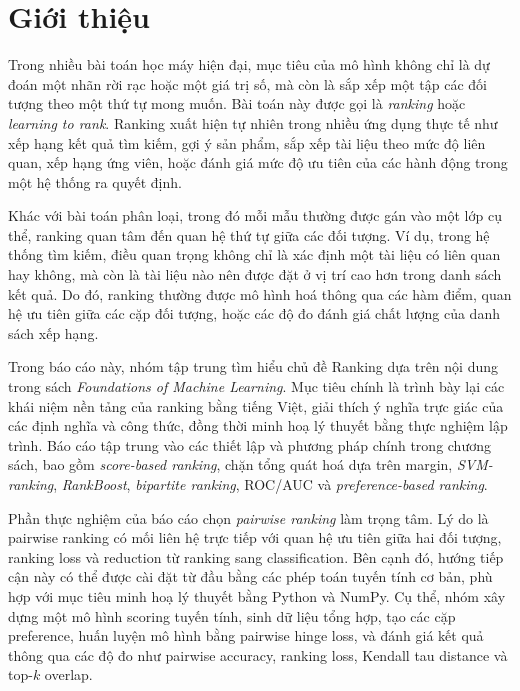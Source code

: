\section{Giới thiệu}

Trong nhiều bài toán học máy hiện đại, mục tiêu của mô hình không chỉ là dự đoán một nhãn rời rạc hoặc một giá trị số, mà còn là sắp xếp một tập các đối tượng theo một thứ tự mong muốn. Bài toán này được gọi là \textit{ranking} hoặc \textit{learning to rank}. Ranking xuất hiện tự nhiên trong nhiều ứng dụng thực tế như xếp hạng kết quả tìm kiếm, gợi ý sản phẩm, sắp xếp tài liệu theo mức độ liên quan, xếp hạng ứng viên, hoặc đánh giá mức độ ưu tiên của các hành động trong một hệ thống ra quyết định.

Khác với bài toán phân loại, trong đó mỗi mẫu thường được gán vào một lớp cụ thể, ranking quan tâm đến quan hệ thứ tự giữa các đối tượng. Ví dụ, trong hệ thống tìm kiếm, điều quan trọng không chỉ là xác định một tài liệu có liên quan hay không, mà còn là tài liệu nào nên được đặt ở vị trí cao hơn trong danh sách kết quả. Do đó, ranking thường được mô hình hoá thông qua các hàm điểm, quan hệ ưu tiên giữa các cặp đối tượng, hoặc các độ đo đánh giá chất lượng của danh sách xếp hạng.

Trong báo cáo này, nhóm tập trung tìm hiểu chủ đề Ranking dựa trên nội dung trong sách \textit{Foundations of Machine Learning}. Mục tiêu chính là trình bày lại các khái niệm nền tảng của ranking bằng tiếng Việt, giải thích ý nghĩa trực giác của các định nghĩa và công thức, đồng thời minh hoạ lý thuyết bằng thực nghiệm lập trình. Báo cáo tập trung vào các thiết lập và phương pháp chính trong chương sách, bao gồm \textit{score-based ranking}, chặn tổng quát hoá dựa trên margin, \textit{SVM-ranking}, \textit{RankBoost}, \textit{bipartite ranking}, ROC/AUC và \textit{preference-based ranking}.

Phần thực nghiệm của báo cáo chọn \textit{pairwise ranking} làm trọng tâm. Lý do là pairwise ranking có mối liên hệ trực tiếp với quan hệ ưu tiên giữa hai đối tượng, ranking loss và reduction từ ranking sang classification. Bên cạnh đó, hướng tiếp cận này có thể được cài đặt từ đầu bằng các phép toán tuyến tính cơ bản, phù hợp với mục tiêu minh hoạ lý thuyết bằng Python và NumPy. Cụ thể, nhóm xây dựng một mô hình scoring tuyến tính, sinh dữ liệu tổng hợp, tạo các cặp preference, huấn luyện mô hình bằng pairwise hinge loss, và đánh giá kết quả thông qua các độ đo như pairwise accuracy, ranking loss, Kendall tau distance và top-\(k\) overlap.

